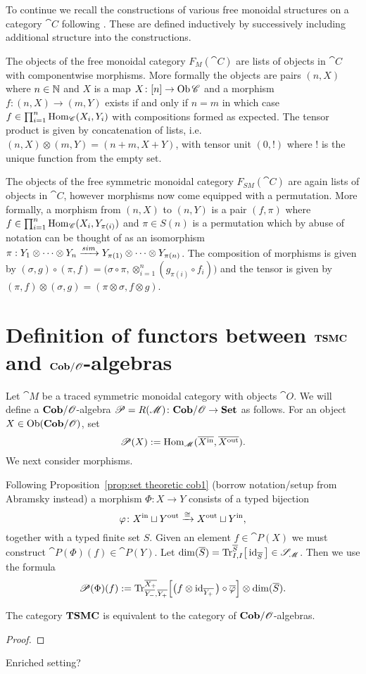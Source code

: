 To continue we recall the constructions of various free monoidal structures on a category $\cat{C}$ following \cite{abramsky}.  These are defined inductively by successively including additional structure into the constructions.

The objects of the free monoidal category $F_M(\cat{C})$ are lists of objects in $\cat{C}$ with componentwise morphisms.  More formally the objects are pairs $(n,X)$ where $n\in\mathbb{N}$ and $X$ is a map $X\colon[n]\to \operatorname{Ob}\mathscr{C}$ and a morphism $f:(n,X)\to(m,Y)$ exists if and only if $n=m$ in which case $f\in\prod_{i=1}^n\operatorname{Hom}_{\mathscr{C}}(X_i,Y_i)$ with compositions formed as expected.  The tensor product is given by concatenation of lists, i.e. $(n,X)\otimes(m,Y)=(n+m,X+Y)$, with tensor unit $(0,!)$ where $!$ is the unique function from the empty set.

The objects of the free symmetric monoidal category $F_{SM}(\cat{C})$ are again lists of objects in $\cat{C}$, however morphisms now come equipped with a permutation.  More formally, a morphism from $(n,X)$ to $(n,Y)$ is a pair $(f,\pi)$ where $f\in\prod_{i=1}^n\operatorname{Hom}_{\mathscr{C}}(X_i,Y_{\pi(i)})$ and $\pi\in S(n)$ is a permutation which by abuse of notation can be thought of as an isomorphism $\pi:Y_1\otimes\cdots\otimes Y_n\xrightarrow{sim} Y_{\pi(1)}\otimes\cdots\otimes Y_{\pi(n)}$.  The composition of morphisms is given by $(\sigma,g)\circ(\pi,f)=\Big(\sigma\circ\pi,\otimes_{i=1}^n (g_{\pi(i)}\circ f_i)\Big)$ and the tensor is given by $(\pi,f)\otimes(\sigma,g)=(\pi\otimes\sigma,f\otimes g)$.  


\section{Definition of functors between $\mathbf{TSMC}$ and $\mathbf{Cob}/\mathscr{O}$-algebras}

Let $\cat{M}$ be a traced symmetric monoidal category with objects $\cat{O}$. We will define a $\mathbf{Cob}/\mathscr{O}$-algebra $\mathscr{P}=R(\mathscr{M})\colon\mathbf{Cob}/\mathscr{O}\to\mathbf{Set}$ as follows. For an object $X\in\operatorname{Ob}(\mathbf{Cob}/\mathscr{O})$, set 
$$\mathscr{P}(X):=\operatorname{Hom}_{\mathscr{M}}(\overline{X^{\text{in}}},\overline{X^{\text{out}}}).$$
We next consider morphisms.

Following Proposition~\ref{prop:set theoretic cob1} (borrow notation/setup from Abramsky instead) a morphism $\Phi\colon X\longrightarrow Y$ consists of a typed bijection 
$$\varphi\colon X^{\text{in}}\sqcup Y^{\text{out}}\xrightarrow{\cong}X^{\text{out}}\sqcup Y^{\text{in}},$$ 
together with a typed finite set $S$. Given an element $f\in\cat{P}(X)$ we must construct $\cat{P}(\Phi)(f)\in\cat{P}(Y)$. Let $\dim(\overline{S})=\textnormal{Tr}^{\overline{S}}_{I,I}\big[\operatorname{id}_{\overline{S}}\big]\in\mathscr{S}_{\mathscr{M}}$. Then we use the formula
$$\mathscr{P}(\Phi)(f):=
\textnormal{Tr}^{\overline{X_+}}_{\overline{Y_-},\overline{Y_+}}\Big[\big(f\otimes\operatorname{id}_{\overline{Y_+}}\big)\circ\overline{\varphi}\Big]
\otimes\dim(\overline{S}).	
$$

\begin{theorem}
 The category $\mathbf{TSMC}$ is equivalent to the category of $\mathbf{Cob}/\mathscr{O}$-algebras.
\end{theorem}
\begin{proof}
 
\end{proof}
\begin{corollary}
 Enriched setting?
\end{corollary}


